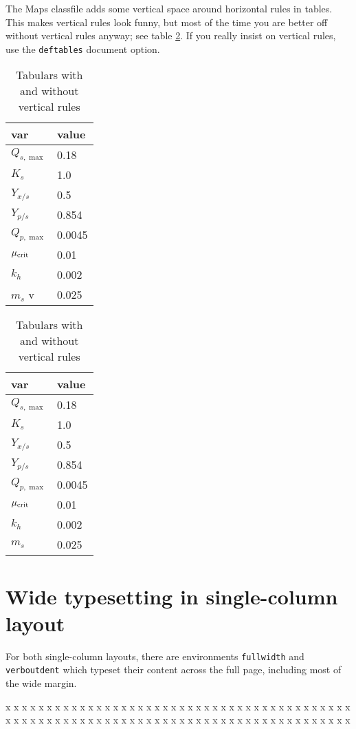 \documentclass[nosubsub]{maps}
\begin{document}
The Maps classfile adds some vertical space around horizontal rules
in tables. This makes vertical rules look funny, but most of the
time you are better off without vertical rules anyway; see table
\ref{tabulars}. If you really insist on vertical rules, use the
\texttt{deftables} document option.

\begin{table}[ht]

\begin{tabular}{|l|l|}
\hline
var & value\\
\hline
$Q_{s,\max}$ & 0.18\\
$K_{s}$      & 1.0\\
$Y_{x/s}$    & 0.5\\
$Y_{p/s}$    & 0.854\\
$Q_{p,\max}$ & 0.0045\\
$\mu_{\rm crit}$  & 0.01\\
$k_{h}$       & 0.002\\
$m_{s}$   v    & 0.025\\
\hline
\end{tabular}\hspace{2pc}
\begin{tabular}{@{}ll@{}}
\hline
var & value\\
\hline
$Q_{s,\max}$   & 0.18\\
$K_{s}$        & 1.0\\
$Y_{x/s}$      & 0.5\\
$Y_{p/s}$      & 0.854\\
$Q_{p,\max}$   & 0.0045\\
$\mu_{\rm crit}$ & 0.01\\
$k_{h}$        & 0.002\\
$m_{s}$        & 0.025\\
\hline
\end{tabular}
\caption{Tabulars with and without vertical rules}\label{tabulars}
\end{table}

\section{Wide typesetting in single-column layout}

For both single-column layouts, there are environments \texttt{fullwidth} and
\texttt{verboutdent} which typeset their content across the full page,
including most of the wide margin.

\begin{fullwidth}
x x x x x x x x x x x x x x x x x x x x x
x x x x x x x x x x x x x x x x x x x x x
x x x x x x x x x x x x x x x x x x x x x
x x x x x x x x x x x x x x x x x x x x x
\end{fullwidth}
\end{document}
